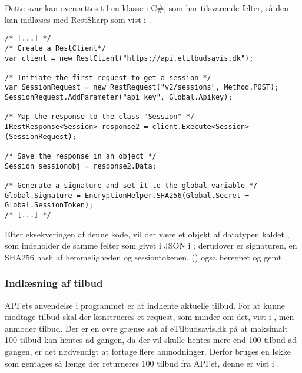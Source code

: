 Dette svar kan oversættes til en klasse i C\#, som har tilsvarende felter, så den kan indlæses med RestSharp som vist i .

\begin{lstlisting}[caption=C\#-kode som opretter en RestClient og anvender den til at oprette et objekt med felter som svarer til JSON dataet givet fra API'en, label=lst:session]
/* [...] */
/* Create a RestClient*/
var client = new RestClient("https://api.etilbudsavis.dk");

/* Initiate the first request to get a session */
var SessionRequest = new RestRequest("v2/sessions", Method.POST);
SessionRequest.AddParameter("api_key", Global.Apikey);

/* Map the response to the class "Session" */
IRestResponse<Session> response2 = client.Execute<Session>(SessionRequest);

/* Save the response in an object */
Session sessionobj = response2.Data;

/* Generate a signature and set it to the global variable */
Global.Signature = EncryptionHelper.SHA256(Global.Secret + Global.SessionToken);
/* [...] */
\end{lstlisting}
Efter eksekveringen af denne kode, vil der være et objekt af datatypen  kaldet , som indeholder de samme felter som givet i JSON i ; derudover er signaturen, en SHA256 hash af hemmeligheden og sessiontokenen, () også beregnet og gemt.

\subsubsection{Indlæsning af tilbud}
API'ets anvendelse i programmet er at indhente aktuelle tilbud.
For at kunne modtage tilbud skal der konstrueres et request, som minder om det, vist i , men anmoder tilbud.
Der er en øvre grænse sat af eTilbudsavis.dk på at maksimalt 100 tilbud kan hentes ad gangen, da der vil skulle hentes mere end 100 tilbud ad gangen, er det nødvendigt at fortage flere anmodninger.
Derfor bruges en  løkke som gentages så længe der returneres 100 tilbud fra API'et, denne er vist i .

